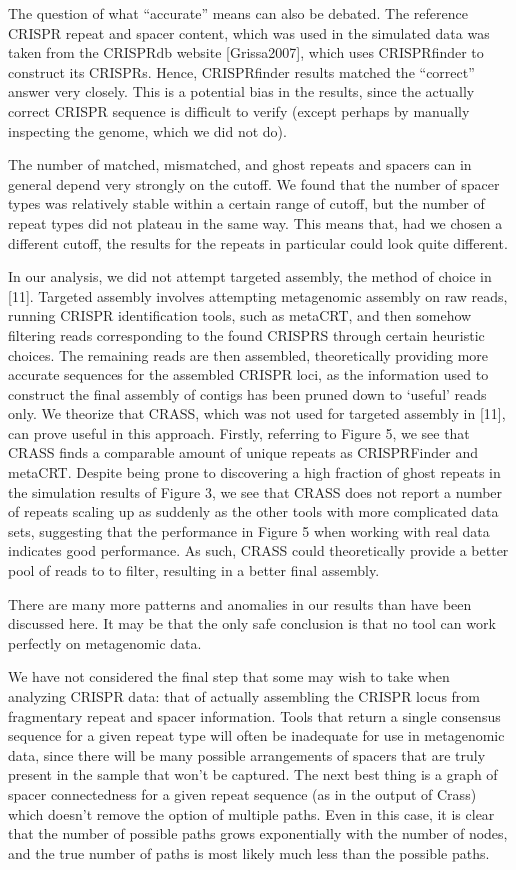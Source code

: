 \documentclass{bmcart}
\begin{document}
The question of what “accurate” means can also be debated. The reference CRISPR repeat and spacer content, which was used in the simulated data  was taken from the CRISPRdb website [Grissa2007], which uses CRISPRfinder to construct its CRISPRs. Hence, CRISPRfinder results matched the “correct” answer very closely. This is a potential bias in the results, since the actually correct CRISPR sequence is difficult to verify (except perhaps by manually inspecting the genome, which we did not do).

The number of matched, mismatched, and ghost repeats and spacers can in general depend very strongly on the cutoff. We found that the number of spacer types was relatively stable within a certain range of cutoff, but the number of repeat types did not plateau in the same way. This means that, had we chosen a different cutoff, the results for the repeats in particular could look quite different. 

In our analysis, we did not attempt targeted assembly, the method of choice in [11]. Targeted assembly involves attempting metagenomic assembly on raw reads, running CRISPR identification tools, such as metaCRT, and then somehow filtering reads corresponding to the found CRISPRS through certain heuristic choices. The remaining reads are then assembled, theoretically providing more accurate sequences for the assembled CRISPR loci, as the information used to construct the final assembly of contigs has been pruned down to ‘useful’ reads only. We theorize that CRASS, which was not used for targeted assembly in [11], can prove useful in this approach. Firstly, referring to Figure 5, we see that CRASS finds a comparable amount of unique repeats as CRISPRFinder and metaCRT. Despite being prone to discovering a high fraction of ghost repeats in the simulation results of Figure 3, we see that CRASS does not report a number of repeats scaling up as suddenly as the other tools with more complicated data sets, suggesting that the performance in Figure 5 when working with real data indicates good performance. As such, CRASS could theoretically provide a better pool of reads to to filter, resulting in a better final assembly. 
 
There are many more patterns and anomalies in our results than have been discussed here. It may be that the only safe conclusion is that no tool can work perfectly on metagenomic data.

We have not considered the final step that some may wish to take when analyzing CRISPR data: that of actually assembling the CRISPR locus from fragmentary repeat and spacer information. Tools that return a single consensus sequence for a given repeat type will often be inadequate for use in metagenomic data, since there will be many possible arrangements of spacers that are truly present in the sample that won’t be captured. The next best thing is a graph of spacer connectedness for a given repeat sequence (as in the output of Crass) which doesn’t remove the option of multiple paths. Even in this case, it is clear that the number of possible paths grows exponentially with the number of nodes, and the true number of paths is most likely much less than the possible paths. 
 
\end{document}
